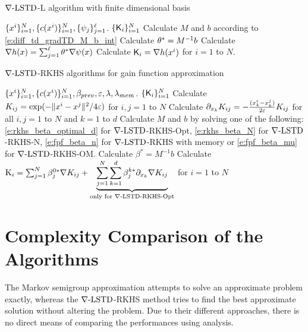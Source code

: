 \begin{algorithm}{$\nabla\text{-LSTD}$-L algorithm with finite dimensional basis}
	\begin{algorithmic}[1]
		\Require $\{x^i\}_{i=1}^N, \{c(x^i)\}_{i=1}^N, \{\psi_j\}_{j=1}^{\ell}$.
		\Ensure $\{\text{\sf K}_i\}_{i=1}^N$
		\State Calculate $M$ and $b$ according to \eqref{e:diff_td_gradTD_M_b_int}
		\State Calculate $\theta^* = M^{-1}b$
		\State Calculate $\nabla h(x)  =  \sum_{j=1}^{\ell}  \theta^* \nabla \psi(x)$  
		\State Calculate $\text{\sf K}_i = \nabla h(x^i)$ for $i=1$ to $N$. 
	\end{algorithmic}
\end{algorithm} 


\label{alg:rkhs}
\begin{algorithm}{$\nabla\text{-LSTD}$-RKHS algorithms for gain function approximation}
	\begin{algorithmic}[1]
		\Require $\{x^i\}_{i=1}^N, \{c(x^i)\}_{i=1}^N, \beta_{prev}, \varepsilon, \lambda, \lambda_{mem}$.
		\Ensure $\{\text{\sf K}_i\}_{i=1}^N$
		\State Calculate $K_{ij} = \exp(-\|x^i - x^j\|^2/ 4\varepsilon)$ for $i,j = 1$ to $N$  
		\State Calculate $ \partial_{x_k}K_{ij} = -\frac{(x_k^i - x_k^j)}{2\varepsilon} K_{ij}$ for all $i,j =1$ to $N$ and $k = 1$ to $d$ 
		\State Calculate $M$ and $b$ by solving one of the following: \eqref{e:rkhs_beta_optimal_d} for $\nabla\text{-LSTD}$-RKHS-Opt, \eqref{e:rkhs_beta_N} for $\nabla\text{-LSTD}$-RKHS-N, \eqref{e:fpf_beta_n} for $\nabla\text{-LSTD}$-RKHS with memory or \eqref{e:fpf_beta_mu} for $\nabla\text{-LSTD}$-RKHS-OM.  
		\State Calculate $\beta^* = M^{-1}b$
		\State Calculate $\text{K}_i  =  \sum_{j=1}^N  \beta^{0*}_j \nabla K_{ij} + \underbrace{\sum_{j=1}^N \sum_{k=1}^d \beta^{k*}_j \partial_{x_k} \nabla K_{ij}}_{\text{only for $\nabla\text{-LSTD}$-RKHS-Opt}}$ for $i =1$ to $N$ 
	\end{algorithmic}
\end{algorithm}

\section{Complexity Comparison of the Algorithms}
\label{s:computational_complexity}
The Markov semigroup approximation attempts to solve an approximate problem exactly, whereas the $\nabla\text{-LSTD}$-RKHS method tries to find the best approximate solution without altering the problem. Due to their different approaches, there is no direct means of comparing the performances using analysis. %
